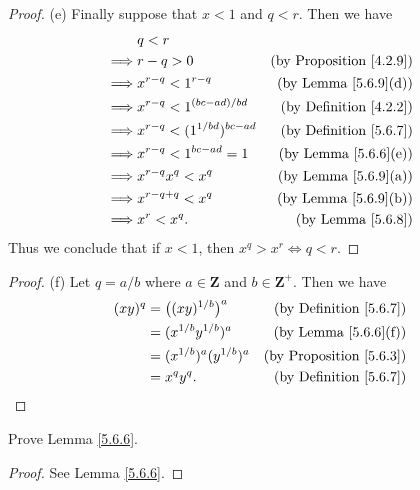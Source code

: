 \begin{proof}{(e)}
    Finally suppose that \(x < 1\) and \(q < r\).
    Then we have
    \begin{align*}
                 & q < r                                                                    \\
        \implies & r - q > 0                          & \text{(by Proposition \ref{4.2.9})} \\
        \implies & x^{r - q} < 1^{r - q}              & \text{(by Lemma \ref{5.6.9}(d))}    \\
        \implies & x^{r - q} < 1^{(bc - ad) / bd}     & \text{(by Definition \ref{4.2.2})}  \\
        \implies & x^{r - q} < (1^{1 / bd})^{bc - ad} & \text{(by Definition \ref{5.6.7})}  \\
        \implies & x^{r - q} < 1^{bc - ad} = 1        & \text{(by Lemma \ref{5.6.6}(e))}    \\
        \implies & x^{r - q} x^q < x^q                & \text{(by Lemma \ref{5.6.9}(a))}    \\
        \implies & x^{r - q + q} < x^q                & \text{(by Lemma \ref{5.6.9}(b))}    \\
        \implies & x^r < x^q.                         & \text{(by Lemma \ref{5.6.8})}
    \end{align*}
    Thus we conclude that if \(x < 1\), then \(x^q > x^r \iff q < r\).
\end{proof}

\begin{proof}{(f)}
    Let \(q = a / b\) where \(a \in \mathbf{Z}\) and \(b \in \mathbf{Z}^+\).
    Then we have
    \begin{align*}
        (xy)^q & = \big((xy)^{1 / b}\big)^a    & \text{(by Definition \ref{5.6.7})}  \\
               & = (x^{1 / b} y^{1 / b})^a     & \text{(by Lemma \ref{5.6.6}(f))}    \\
               & = (x^{1 / b})^a (y^{1 / b})^a & \text{(by Proposition \ref{5.6.3})} \\
               & = x^q y^q.                    & \text{(by Definition \ref{5.6.7})}
    \end{align*}
\end{proof}

\exercisesection

\begin{exercise}\label{ex 5.6.1}
    Prove Lemma \ref{5.6.6}.
\end{exercise}

\begin{proof}
    See Lemma \ref{5.6.6}.
\end{proof}

